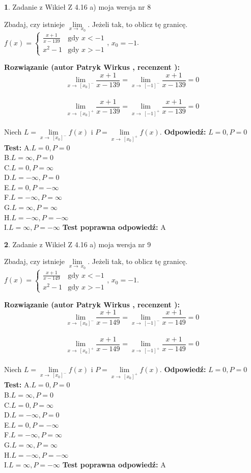\documentclass[12pt, a4paper]{article}
\theoremstyle{definition} %
\newtheorem{zad}{}
\newcommand{\zadStart}[1]{\begin{zad}#1\newline}
\newcommand{\zadStop}{\end{zad}}
\newcommand{\rozwStart}[2]{\noindent \textbf{Rozwiązanie (autor #1 , recenzent #2): }\newline}
\newcommand{\rozwStop}{\newline}
\newcommand{\odpStart}{\noindent \textbf{Odpowiedź:}\newline}
\newcommand{\odpStop}{\newline}
\newcommand{\testStart}{\noindent \textbf{Test:}\newline}
\newcommand{\testStop}{\newline}
\newcommand{\kluczStart}{\noindent \textbf{Test poprawna odpowiedź:}\newline}
\newcommand{\kluczStop}{\newline}
\begin{document}
\zadStart{Zadanie z Wikieł Z 4.16 a) moja wersja nr 8}

Zbadaj, czy istnieje $\lim\limits_{x\to\ x_{0}}$. Jeżeli tak, to oblicz tę granicę.\\   $f(x) = \left\{ \begin{array}{ll}
\frac{x+1}{x-139} & \textrm{gdy $x<-1$}\\
x^{2}-1 & \textrm{gdy $x>-1$}
\end{array} \right.$, $x_{0}=-1$.
\zadStop
\rozwStart{Patryk Wirkus}{}
$$\lim\limits_{x\to\ [x_{0}]^{-}}\frac{x+1}{x-139} = \lim\limits_{x\to\ [-1]^{-}}\frac{x+1}{x-139} = 0$$
\\
$$\lim\limits_{x\to\ [x_{0}]^{+}}\frac{x+1}{x-139} = \lim\limits_{x\to\ [-1]^{+}}\frac{x+1}{x-139} = 0$$
\\
Niech $L=\lim\limits_{x\to\ [x_{0}]^{-}}f(x)$ i $P=\lim\limits_{x\to\ [x_{0}]^{+}}f(x)$.
\rozwStop
\odpStart
$L=0, P=0$
\odpStop
\testStart
A.$L=0, P=0$\\ B.$L=\infty, P=0$\\ C.$L=0, P=\infty$\\ D.$L=-\infty, P=0$\\ E.$L=0, P=-\infty$\\
F.$L=-\infty, P=\infty$\\ G.$L=\infty, P=\infty$\\
H.$L=-\infty, P=-\infty$\\
I.$L=\infty, P=-\infty$
\testStop
\kluczStart
A
\kluczStop



\zadStart{Zadanie z Wikieł Z 4.16 a) moja wersja nr 9}

Zbadaj, czy istnieje $\lim\limits_{x\to\ x_{0}}$. Jeżeli tak, to oblicz tę granicę.\\   $f(x) = \left\{ \begin{array}{ll}
\frac{x+1}{x-149} & \textrm{gdy $x<-1$}\\
x^{2}-1 & \textrm{gdy $x>-1$}
\end{array} \right.$, $x_{0}=-1$.
\zadStop
\rozwStart{Patryk Wirkus}{}
$$\lim\limits_{x\to\ [x_{0}]^{-}}\frac{x+1}{x-149} = \lim\limits_{x\to\ [-1]^{-}}\frac{x+1}{x-149} = 0$$
\\
$$\lim\limits_{x\to\ [x_{0}]^{+}}\frac{x+1}{x-149} = \lim\limits_{x\to\ [-1]^{+}}\frac{x+1}{x-149} = 0$$
\\
Niech $L=\lim\limits_{x\to\ [x_{0}]^{-}}f(x)$ i $P=\lim\limits_{x\to\ [x_{0}]^{+}}f(x)$.
\rozwStop
\odpStart
$L=0, P=0$
\odpStop
\testStart
A.$L=0, P=0$\\ B.$L=\infty, P=0$\\ C.$L=0, P=\infty$\\ D.$L=-\infty, P=0$\\ E.$L=0, P=-\infty$\\
F.$L=-\infty, P=\infty$\\ G.$L=\infty, P=\infty$\\
H.$L=-\infty, P=-\infty$\\
I.$L=\infty, P=-\infty$
\testStop
\kluczStart
A
\kluczStop
\end{document}

